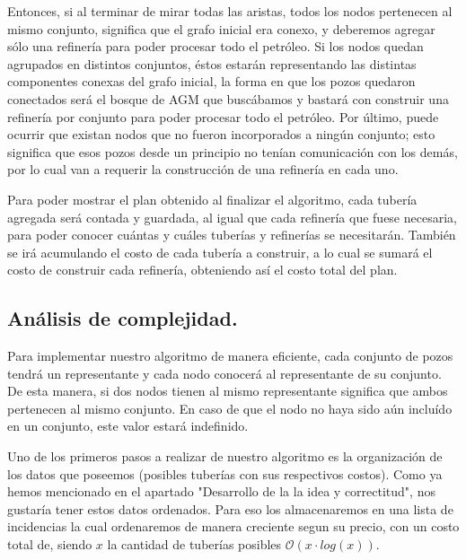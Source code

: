 Entonces, si al terminar de mirar todas las aristas, todos los nodos pertenecen al mismo conjunto, significa que el grafo inicial era conexo, y deberemos agregar sólo una refinería para poder procesar todo el petróleo.  Si los nodos quedan agrupados en distintos conjuntos, éstos estarán representando las distintas componentes conexas del grafo inicial, la forma en que los pozos quedaron conectados será el bosque de AGM que buscábamos y bastará con construir una refinería por conjunto para poder procesar todo el petróleo.  Por último, puede ocurrir que existan nodos que no fueron incorporados a ningún conjunto; esto significa que esos pozos desde un principio no tenían comunicación con los demás, por lo cual van a requerir la construcción de una refinería en cada uno.

Para poder mostrar el plan obtenido al finalizar el algoritmo, cada tubería agregada será contada y guardada, al igual que cada refinería que fuese necesaria, para poder conocer cuántas y cuáles tuberías y refinerías se necesitarán.  También se irá acumulando el costo de cada tubería a construir, a lo cual se sumará el costo de construir cada refinería, obteniendo así el costo total del plan.

\vspace*{0.6cm}

\subsection{Análisis de complejidad.}

\vspace*{0.3cm}

Para implementar nuestro algoritmo de manera eficiente, cada conjunto de pozos tendrá un representante y cada nodo conocerá al representante de su conjunto. De esta manera, si dos nodos tienen al mismo representante significa que ambos pertenecen al mismo conjunto.  En caso de que el nodo no haya sido aún incluído en un conjunto, este valor estará indefinido.


Uno de los primeros pasos a realizar de nuestro algoritmo es la organización de los datos que poseemos (posibles tuberías con sus respectivos costos). Como ya hemos mencionado en el apartado "Desarrollo de la la idea y correctitud", nos gustaría tener estos datos ordenados. Para eso los almacenaremos en una lista de incidencias la cual ordenaremos de manera creciente segun su precio, con un costo total de, siendo $x$ la cantidad de tuberías posibles $\mathcal{O}(x \cdot log(x))$.

